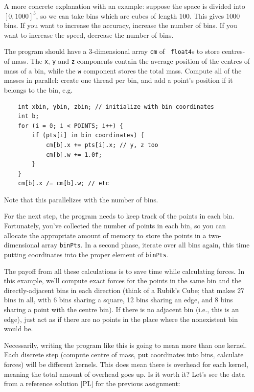 \documentclass[a4paper]{report}
\begin{document}
A more concrete explanation with an example: suppose the space  is divided into $[0, 1000]^3$, so we can take bins which are cubes of length 100. This gives 1000 bins. If you want to increase the accuracy, increase the number of bins. If you want to increase the speed, decrease the number of bins.

The program should have a 3-dimensional array {\tt cm} of {\tt
  float4}s to store centres-of-mass. The {\tt x}, {\tt y} and {\tt z}
components contain the average position of the centres of mass of a
bin, while the {\tt w} component stores the total mass. Compute all of
the masses in parallel: create one thread per bin, and add a point's
position if it belongs to the bin, e.g.

\begin{lstlisting}
    int xbin, ybin, zbin; // initialize with bin coordinates
    int b;
    for (i = 0; i < POINTS; i++) {
        if (pts[i] in bin coordinates) {
            cm[b].x += pts[i].x; // y, z too
            cm[b].w += 1.0f;
        }
    }
    cm[b].x /= cm[b].w; // etc
\end{lstlisting}

 \noindent
Note that this parallelizes with the number of bins.

For the next step, the program needs to keep track of the points in
each bin. Fortunately, you've collected the number of points in each
bin, so you can allocate the appropriate amount of memory to store the
points in a two-dimensional array {\tt binPts}. In a second phase,
iterate over all bins again, this time putting coordinates into the
proper element of {\tt binPts}.


The payoff from all these calculations is to save time while
calculating forces. In this example, we'll compute exact
forces for the points in the same bin and the directly-adjacent bins
in each direction (think of a Rubik's Cube; that makes 27 bins in all,
with 6 bins sharing a square, 12 bins sharing an edge, and 8 bins
sharing a point with the centre bin). If there is no adjacent bin 
(i.e., this is an edge), just act as if there are no points 
in the place where the nonexistent bin would be. 

Necessarily, writing the program like this is going to mean more than one kernel.
Each discrete step (compute centre of mass, put coordinates into bins, 
calculate forces) will be different kernels. This does mean there is overhead for each kernel, meaning the total amount of overhead goes up. Is it worth it? Let's see the data from a reference solution [PL] for the previous assignment:
\end{document}
